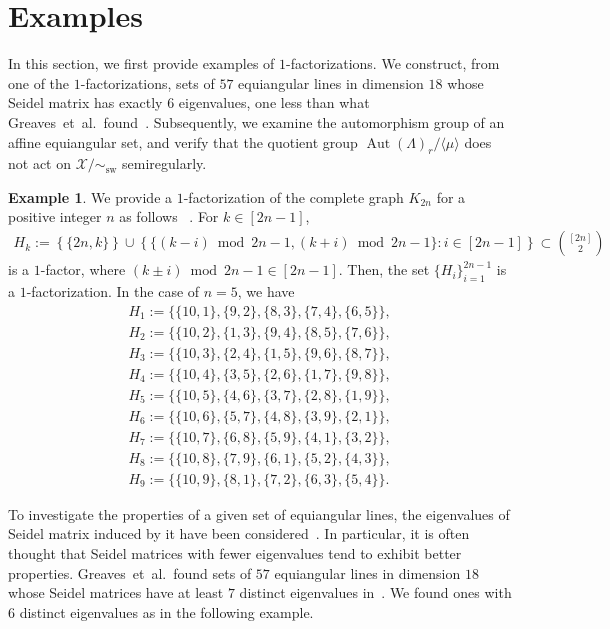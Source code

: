 \documentclass[reqno, 11pt]{amsart}
\numberwithin{equation}{section}
\theoremstyle{definition}
\newtheorem{example}[lem]{Example}%
\DeclareMathOperator{\Aut}{Aut}
\DeclareMathOperator{\sw}{sw}
\DeclareMathOperator{\iso}{iso}
\newcommand{\cX}{\mathcal{X}}
\newcommand{\sr}{ r } %
\begin{document}
\section{Examples}	\label{sec:Howell}
In this section, we first provide examples of $1$-factorizations.  
We construct, from one of the $1$-factorizations, sets of $57$ equiangular lines in dimension $18$ whose Seidel matrix has exactly $6$ eigenvalues, one less than what Greaves~et~al.\ found~\cite{Greaves2023}.  
Subsequently, we examine the automorphism group of an affine equiangular set, and verify that the quotient group $\Aut(\Lambda)_{\sr}/\langle \mu \rangle$ does not act on $\cX/\sim_{\sw}$ semiregularly.

\begin{example}
	We provide a $1$-factorization of the complete graph $K_{2n}$ for a positive integer $n$ as follows~\cite[5.46]{handbook} .
	For $k \in [2n-1]$, 
	\begin{align*}
		H_k := \left\{ \{ 2n, k \} \right\} \cup \left\{ \{ (k-i) \bmod{2n-1}  , (k+i) \bmod{2n-1} \} : i \in [2n-1]  \right\} \subset \binom{[2n]}{2}
	\end{align*}
	is a $1$-factor, where $(k \pm i) \bmod{2n-1} \in [2n-1]$.
	Then, the set $\{ H_i \}_{i=1}^{2n-1}$ is a $1$-factorization.
	In the case of $n = 5$, we have
	\begin{gather*}
		H_1 := \{\{10, 1\}, \{9, 2\}, \{8, 3\}, \{7, 4\}, \{6, 5\}\}, \\
		H_2 := \{\{10, 2\}, \{1, 3\}, \{9, 4\}, \{8, 5\}, \{7, 6\}\}, \\
		H_3 := \{\{10, 3\}, \{2, 4\}, \{1, 5\}, \{9, 6\}, \{8, 7\}\}, \\
		H_4 := \{\{10, 4\}, \{3, 5\}, \{2, 6\}, \{1, 7\}, \{9, 8\}\}, \\
		H_5 := \{\{10, 5\}, \{4, 6\}, \{3, 7\}, \{2, 8\}, \{1, 9\}\}, \\
		H_6 := \{\{10, 6\}, \{5, 7\}, \{4, 8\}, \{3, 9\}, \{2, 1\}\}, \\
		H_7 := \{\{10, 7\}, \{6, 8\}, \{5, 9\}, \{4, 1\}, \{3, 2\}\}, \\
		H_8 := \{\{10, 8\}, \{7, 9\}, \{6, 1\}, \{5, 2\}, \{4, 3\}\}, \\
		H_9 := \{\{10, 9\}, \{8, 1\}, \{7, 2\}, \{6, 3\}, \{5, 4\}\}.
	\end{gather*}
\end{example}
To investigate the properties of a given set of equiangular lines, the eigenvalues of Seidel matrix induced by it have been considered~\cite{cao2021, Greaves2023, yoshino2021}.
In particular, it is often thought that Seidel matrices with fewer eigenvalues tend to exhibit better properties.
Greaves~et~al.\ found sets of $57$ equiangular lines in dimension $18$ whose Seidel matrices have at least $7$ distinct eigenvalues in~\cite{Greaves2023}. 
We found ones with $6$ distinct eigenvalues as in the following example.
\end{document}

